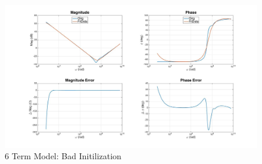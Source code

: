 \begin{figure}[ht!]
\ifisPPT
\noindent{}
\else
\includegraphics[keepaspectratio=true,width=6in]{./figures/regression/fullModel_BadOutput.jpg}
\fi
\centering
\caption{6 Term Model: Bad Initilization}
\label{fig:fullModel_BadOutput}
\end{figure}
